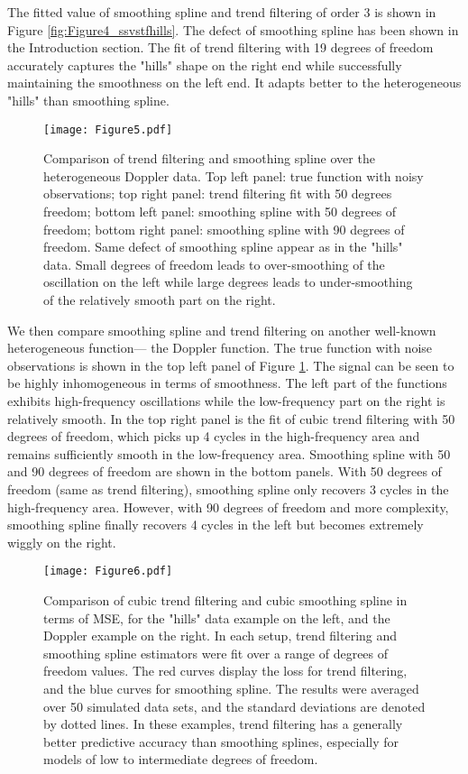 \documentclass[a4paper]{article}
\begin{document}
The fitted value of smoothing spline and trend filtering of order $3$ is shown in Figure \ref{fig:Figure4_ssvstfhills}. The defect of smoothing spline has been shown in the Introduction section. The fit of trend filtering with 19 degrees of freedom accurately captures the "hills" shape on the right end while successfully maintaining the smoothness on the left end. It adapts better to the heterogeneous "hills" than smoothing spline.

\begin{figure}[t]
\centering
\texttt{[image: Figure5.pdf]}
\caption{Comparison of trend filtering and smoothing spline over the heterogeneous Doppler data. Top left panel: true function with noisy observations; top right panel: trend filtering fit with 50 degrees freedom; bottom left panel: smoothing spline with 50 degrees of freedom; bottom right panel: smoothing spline with 90 degrees of freedom. Same defect of smoothing spline appear as in the "hills" data. Small degrees of freedom leads to over-smoothing of the oscillation on the left while large degrees leads to under-smoothing of the relatively smooth part on the right.}
\label{fig:Figure5_ssvstfdoppler}
\end{figure}

We then compare smoothing spline and trend filtering on another well-known heterogeneous function--- the Doppler function. The true function with noise observations is shown in the top left panel of Figure \ref{fig:Figure5_ssvstfdoppler}. The signal can be seen to be highly inhomogeneous in terms of smoothness. The left part of the functions exhibits high-frequency oscillations while the low-frequency part on the right is relatively smooth. In the top right panel is the fit of cubic trend filtering with 50 degrees of freedom, which picks up 4 cycles in the high-frequency area and remains sufficiently smooth in the low-frequency area. Smoothing spline with 50 and 90 degrees of freedom are shown in the bottom panels. With 50 degrees of freedom (same as trend filtering), smoothing spline only recovers 3 cycles in the high-frequency area. However, with 90 degrees of freedom and more complexity, smoothing spline finally recovers 4 cycles in the left but becomes extremely wiggly on the right. 

\begin{figure}[t]
\centering
\texttt{[image: Figure6.pdf]}
\caption{Comparison of cubic trend filtering and cubic smoothing spline in terms of MSE, for the "hills" data example on the left, and the Doppler example on the right. In each setup, trend filtering and smoothing spline estimators were fit over a range of degrees of freedom values. The red curves display the loss for trend filtering, and the blue curves for smoothing spline. The results were averaged over 50 simulated data sets, and the standard deviations are denoted by dotted lines. In these examples, trend filtering has a generally better predictive accuracy than smoothing splines, especially for models of low to intermediate degrees of freedom.}
\label{fig:Figure6_mse}
\end{figure}
\end{document}
